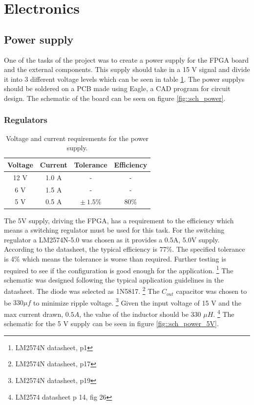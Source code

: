\section{Electronics}
\subsection{Power supply}
One of the tasks of the project was to create a power supply for the FPGA board and the external components. This supply should take in a 15 V signal and divide it into 3 different voltage levels which can be seen in table \ref{tab::power_req}. The power supplys should be soldered on a PCB made using Eagle, a CAD program for circuit design. The schematic of the board can be seen on figure \ref{fig::sch_power}.
\subsubsection{Regulators}
\begin{table}
 \vspace{5 pt}
 \begin{tabular}{cccc}
  Voltage & Current & Tolerance      & Efficiency \\ \toprule
  12 V    & 1.0 A   & -              & -          \\
  6 V     & 1.5 A   & -              & -          \\
  5 V     & 0.5 A   & $\pm\ 1.5 \%$  & 80\%       \\
  \bottomrule
 \end{tabular}
\caption{Voltage and current requirements for the power supply.}
\label{tab::power_req}
 \vspace{5 pt}
\end{table}
The 5V supply, driving the FPGA, has a requirement to the efficiency which means a switching regulator must be used for this task. 
For the switching regulator a LM2574N-5.0 was chosen as it provides a 0.5A, 5.0V supply.
According to the datasheet, the typical efficiency is 77\%\cite{ds:LM2574N}.
The specified tolerance is 4\% which means the tolerance is worse than required. Further testing is required to see if the configuration is good enough for the application.
\footnote{LM2574N datasheet, p1}
The schematic was designed following the typical application guidelines in the datasheet.
The diode was selected as 1N5817. 
\footnote{LM2574N datasheet, p17}
The $C_{out}$ capacitor was chosen to be $330\mu f$ to minimize ripple voltage.
\footnote{LM2574N datasheet, p19}
Given the input voltage of 15 V and the max current drawn, $0.5 A$, the value of the inductor should be 330 $\mu H$. 
\footnote{LM2574 datasheet p 14, fig 26}
The schematic for the 5 V supply can be seen in figure \ref{fig::sch_power_5V}.

